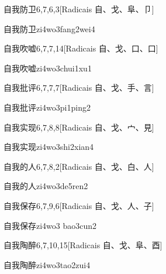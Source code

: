 \begin{entry}{自我防卫}{6,7,6,3}[Radicais ⾃、⼽、⾩、⼙]
  \begin{phonetics}{自我防卫}{zi4wo3fang2wei4}
  \end{phonetics}
\end{entry}

\begin{entry}{自我吹嘘}{6,7,7,14}[Radicais ⾃、⼽、⼝、⼝]
  \begin{phonetics}{自我吹嘘}{zi4wo3chui1xu1}
  \end{phonetics}
\end{entry}

\begin{entry}{自我批评}{6,7,7,7}[Radicais ⾃、⼽、⼿、⾔]
  \begin{phonetics}{自我批评}{zi4wo3pi1ping2}
  \end{phonetics}
\end{entry}

\begin{entry}{自我实现}{6,7,8,8}[Radicais ⾃、⼽、⼧、⾒]
  \begin{phonetics}{自我实现}{zi4wo3shi2xian4}
  \end{phonetics}
\end{entry}

\begin{entry}{自我的人}{6,7,8,2}[Radicais ⾃、⼽、⽩、⼈]
  \begin{phonetics}{自我的人}{zi4wo3de5ren2}
  \end{phonetics}
\end{entry}

\begin{entry}{自我保存}{6,7,9,6}[Radicais ⾃、⼽、⼈、⼦]
  \begin{phonetics}{自我保存}{zi4wo3 bao3cun2}
  \end{phonetics}
\end{entry}

\begin{entry}{自我陶醉}{6,7,10,15}[Radicais ⾃、⼽、⾩、⾣]
  \begin{phonetics}{自我陶醉}{zi4wo3tao2zui4}
  \end{phonetics}
\end{entry}

